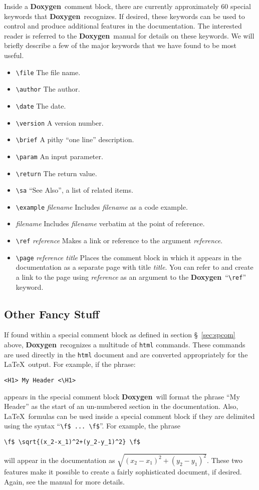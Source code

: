 \documentclass[11pt]{nmemo}
\newcommand{\doxy}{{\normalfont\bfseries Doxygen}}
\begin{document}
Inside a \doxy\ comment block, there are currently approximately 60
special keywords that \doxy\ recognizes. If desired, these keywords
can be used to control and produce additional features in the
documentation.  The interested reader is referred to the \doxy\ manual
for details on these keywords.  We will briefly describe a few of the major
keywords that we have found to be most useful.
\begin{itemize}
\item \verb+\file+ The file name.
\item \verb+\author+ The author.
\item \verb+\date+ The date.
\item \verb+\version+ A version number.
\item \verb+\brief+ A pithy ``one line'' description.
\item \verb+\param+ An input parameter.
\item \verb+\return+ The return value.
\item \verb+\sa+ ``See Also'', a list of related items.
\item \verb+\example+ {\em filename} Includes {\em filename} as a code
  example.
\item \verb++ {\em filename} Includes {\em filename} verbatim at the
  point of reference.
\item \verb+\ref+ {\em reference} Makes a link or reference 
  to the argument {\em reference}.
\item \verb+\page+ {\em reference title} Places the comment block in which
  it appears in the documentation as a separate page with title {\em
    title}. You can refer to and create a link to the page using {\em
    reference} as an argument to the \doxy\ ``\verb+\ref+'' keyword.
\end{itemize}

\subsection{Other Fancy Stuff}

If found within a special comment block 
as defined in section \S~\ref{sec:spcom} above, \doxy\ 
recognizes a multitude of \texttt{html} commands. These
commands are used directly in the \texttt{html} document and are converted 
appropriately for the \LaTeX\ output. 
For example, if the phrase: 
\begin{verbatim}
<H1> My Header <\H1>
\end{verbatim} appears in the special comment
block \doxy\ will format the phrase ``My Header'' as the start of an
un-numbered section in the documentation. 
Also, \LaTeX\ formulas can be used inside a special
comment block if they are delimited using the syntax ``\verb+\f$ ... \f$+''.
For example, the phrase 
\begin{verbatim}
\f$ \sqrt{(x_2-x_1)^2+(y_2-y_1)^2} \f$ 
\end{verbatim}  will appear in the
documentation as $\sqrt{(x_2-x_1)^2+(y_2-y_1)^2}$.
These two
features make it possible to create a fairly sophisticated document, if desired.
Again, see the manual for more details.
\end{document}
